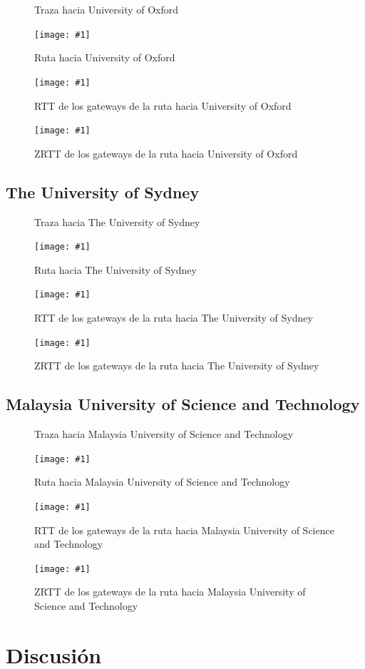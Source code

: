\documentclass[a4paper, 10pt, twoside]{article}
\newcommand{\estadisticas}[3]{
  \begin{figure}[H]
    \small
    
    \normalsize
    \caption{#2}
    \label{#3}
  \end{figure}
}
\newcommand{\grafico}[3]{
  \begin{figure}[H]
    \texttt{[image: \#1]}
    \caption{#2}
    \label{#3}
  \end{figure}
}
\newcommand{\oxford}{University of Oxford}
\newcommand{\sydney}{The University of Sydney}
\newcommand{\must}{Malaysia University of Science and Technology}
\begin{document}
\estadisticas{statistics-www.ox.ac.uk.txt}
             {Traza hacia \oxford}
             {fig:trace-oxford}

\grafico{map-www.ox.ac.uk}
        {Ruta hacia \oxford}
        {fig:map-oxford}

\grafico{rtt-www.ox.ac.uk}
        {RTT de los gateways de la ruta hacia \oxford}
        {fig:rtt-oxford}

\grafico{zrtt-www.ox.ac.uk}
        {ZRTT de los gateways de la ruta hacia \oxford}
        {fig:zrtt-oxford}


\subsection{\sydney}

\estadisticas{statistics-www.sydney.edu.au.txt}
             {Traza hacia \sydney}
             {fig:trace-sydney}

\grafico{map-www.sydney.edu.au}
        {Ruta hacia \sydney}
        {fig:map-sydney}

\grafico{rtt-www.sydney.edu.au}
        {RTT de los gateways de la ruta hacia \sydney}
        {fig:rtt-sydney}

\grafico{zrtt-www.sydney.edu.au}
        {ZRTT de los gateways de la ruta hacia \sydney}
        {fig:zrtt-sydney}


\subsection{\must}

\estadisticas{statistics-www.must.edu.my.txt}
             {Traza hacia \must}
             {fig:trace-must}

\grafico{map-www.must.edu.my}
        {Ruta hacia \must}
        {fig:map-must}

\grafico{rtt-www.must.edu.my}
        {RTT de los gateways de la ruta hacia \must}
        {fig:rtt-must}

\grafico{zrtt-www.must.edu.my}
        {ZRTT de los gateways de la ruta hacia \must}
        {fig:zrtt-must}




\section{Discusión}
\end{document}
